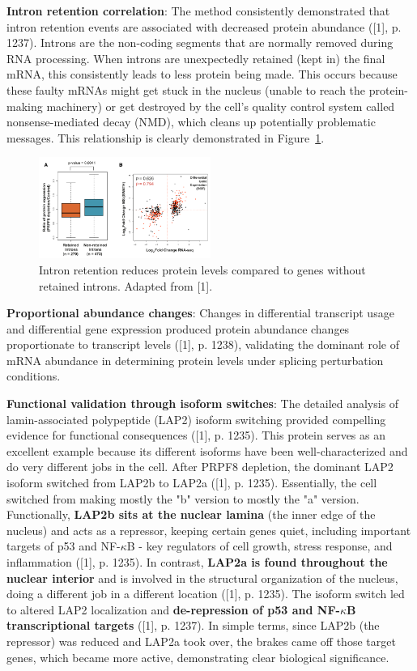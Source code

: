 \documentclass[12pt,a4paper]{article}
\begin{document}
\textbf{Intron retention correlation}: The method consistently demonstrated that intron retention events are associated with decreased protein abundance ([1], p. 1237). Introns are the non-coding segments that are normally removed during RNA processing. When introns are unexpectedly retained (kept in) the final mRNA, this consistently leads to less protein being made. This occurs because these faulty mRNAs might get stuck in the nucleus (unable to reach the protein-making machinery) or get destroyed by the cell's quality control system called nonsense-mediated decay (NMD), which cleans up potentially problematic messages. This relationship is clearly demonstrated in Figure~\ref{fig:intron_retention}.

\begin{figure}[H]
\centering
\includegraphics[width=0.5\textwidth]{intron_retention_figure_6_liu.png}
\caption{Intron retention reduces protein levels compared to genes without retained introns. Adapted from [1].}
\label{fig:intron_retention}
\end{figure}

\textbf{Proportional abundance changes}: Changes in differential transcript usage and differential gene expression produced protein abundance changes proportionate to transcript levels ([1], p. 1238), validating the dominant role of mRNA abundance in determining protein levels under splicing perturbation conditions.

\textbf{Functional validation through isoform switches}: The detailed analysis of lamin-associated polypeptide (LAP2) isoform switching provided compelling evidence for functional consequences ([1], p. 1235). This protein serves as an excellent example because its different isoforms have been well-characterized and do very different jobs in the cell. After PRPF8 depletion, the dominant LAP2 isoform switched from LAP2b to LAP2a ([1], p. 1235). Essentially, the cell switched from making mostly the "b" version to mostly the "a" version. Functionally, \textbf{LAP2b sits at the nuclear lamina} (the inner edge of the nucleus) and acts as a repressor, keeping certain genes quiet, including important targets of p53 and NF-$\kappa$B - key regulators of cell growth, stress response, and inflammation ([1], p. 1235). In contrast, \textbf{LAP2a is found throughout the nuclear interior} and is involved in the structural organization of the nucleus, doing a different job in a different location ([1], p. 1235). The isoform switch led to altered LAP2 localization and \textbf{de-repression of p53 and NF-$\kappa$B transcriptional targets} ([1], p. 1237). In simple terms, since LAP2b (the repressor) was reduced and LAP2a took over, the brakes came off those target genes, which became more active, demonstrating clear biological significance.
\end{document}

